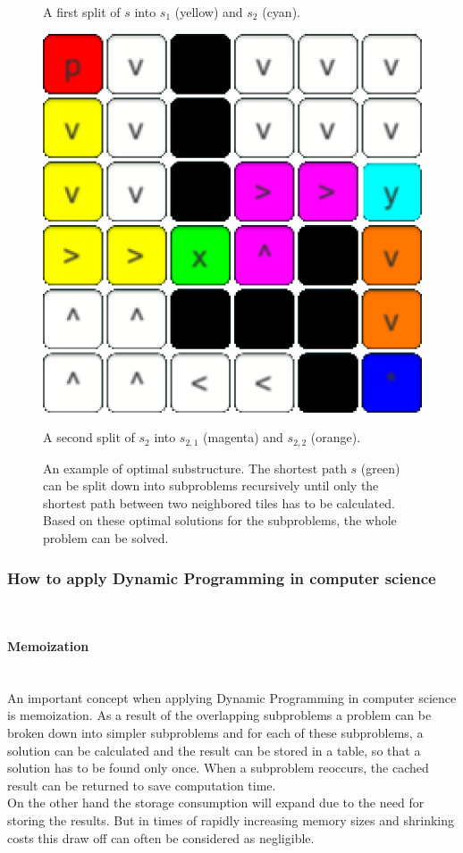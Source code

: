 \documentclass[conference]{IEEEtran}
\begin{document}
\begin{figure}[h]
\begin{minipage}[t]{0.3\linewidth}
\caption{A first split of $s$ into $s_1$ (yellow) and $s_2$ (cyan).}
\end{minipage}
\hfill
\begin{minipage}[t]{0.3\linewidth}
\centering
\includegraphics[width=1\textwidth]{images/OptimalSubstructure/second.png}
\caption{A second split of $s_2$ into $s_{2,1}$ (magenta) and $s_{2,2}$ (orange).}
\end{minipage}
\caption{An example of optimal substructure. The shortest path $s$ (green) can be split down into subproblems recursively until only the shortest path between two neighbored tiles has to be calculated. Based on these optimal solutions for the subproblems, the whole problem can be solved.}
\end{figure}

\subsubsection{How to apply Dynamic Programming in computer science}
\quad \\
\paragraph{Memoization}
\quad \\
An important concept when applying Dynamic Programming in computer science is memoization. As a result of the overlapping subproblems a problem can be broken down into simpler subproblems and for each of these subproblems, a solution can be calculated and the result can be stored in a table, so that a solution has to be found only once. When a subproblem reoccurs, the cached result can be returned to save computation time. \cite{Cormen.2007}
\\
On the other hand the storage consumption will expand due to the need for storing the results. But in times of rapidly increasing memory sizes and shrinking costs this draw off can often be considered as negligible.
\\
\end{document}
